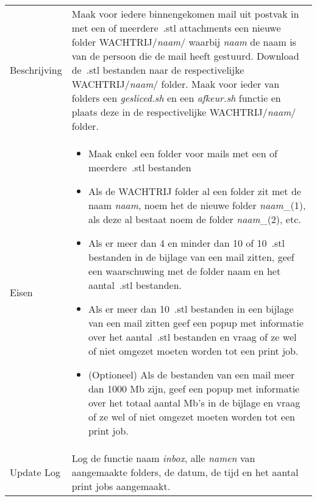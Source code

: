 \documentclass{article}
\begin{document}
\begin{table}[H]
    \centering
    \begin{tabular}%
    {>{\raggedright\arraybackslash}p{}%
    |>{\raggedright\arraybackslash}p{}}
    \rowcolor{myblue}\multicolumn{2}{c}{\rule{0pt}{13pt}Functie: {\Large \textit{inbox.sh}}}\\\hline
    Beschrijving & 
    Maak voor iedere binnengekomen mail uit postvak in met een of meerdere~.stl attachments een nieuwe folder WACHTRIJ/\textit{naam}/ waarbij \textit{naam} de naam is van de persoon die de mail heeft gestuurd. Download de~.stl bestanden naar de respectivelijke WACHTRIJ/\textit{naam}/ folder. Maak voor ieder van folders een \textit{gesliced.sh} en een \textit{afkeur.sh} functie en plaats deze in de respectivelijke WACHTRIJ/\textit{naam}/ folder.\\
  Eisen & 
\begin{itemize} 
\item Maak enkel een folder voor mails met een of meerdere~.stl bestanden
\item Als de WACHTRIJ folder al een folder zit met de naam \textit{naam}, noem het de nieuwe folder \textit{naam}\_(1), als deze al bestaat noem de folder \textit{naam}\_(2), etc.
\item Als er meer dan 4 en minder dan 10 of 10~.stl bestanden in de bijlage van een mail zitten, geef een waarschuwing met de folder naam en het aantal~.stl bestanden.
\item Als er meer dan 10~.stl bestanden in een bijlage van een mail zitten geef een popup met informatie over het aantal~.stl bestanden en vraag of ze wel of niet omgezet moeten worden tot een print job. 
\item (Optioneel) Als de bestanden van een mail meer dan 1000 Mb zijn, geef een popup met informatie over het totaal aantal Mb's in de bijlage en vraag of ze wel of niet omgezet moeten worden tot een print job. 
\end{itemize} \\
  Update Log& Log de functie naam \textit{inbox}, alle \textit{namen} van aangemaakte folders, de datum, de tijd en het aantal print jobs aangemaakt.\\
    \end{tabular}
\end{table}
\end{document}
